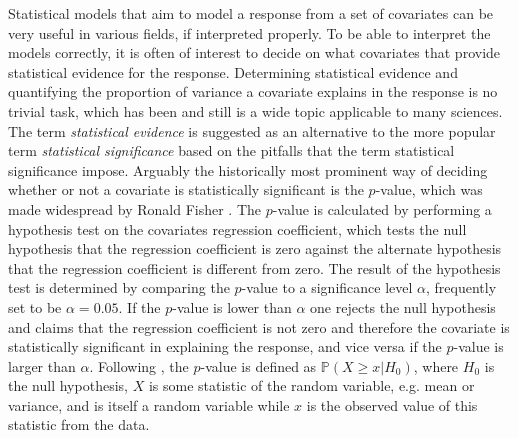 Statistical models that aim to model a response from a set of covariates can be very useful in various fields, if interpreted properly.
To be able to interpret the models correctly, it is often of interest to decide on what covariates that provide statistical evidence \citep{muff2022rewriting} for the response. 
Determining statistical evidence and quantifying the proportion of variance a covariate explains in the response is no trivial task, which has been and still is a wide topic applicable to many sciences.
The term \textit{statistical evidence} is suggested as an alternative to the more popular term \textit{statistical significance} based on the pitfalls that the term statistical significance impose.
\newline
\newline 
Arguably the historically most prominent way of deciding whether or not a covariate is statistically significant is the $p$-value, which was made widespread by Ronald Fisher \citep{Fisher1925}.
The $p$-value is calculated by performing a hypothesis test on the covariates regression coefficient, which tests the null hypothesis that the regression coefficient is zero against the alternate hypothesis that the regression coefficient is different from zero.
The result of the hypothesis test is determined by comparing the $p$-value to a significance level $\alpha$, frequently set to be $\alpha=0.05$.
If the $p$-value is lower than $\alpha$ one rejects the null hypothesis and claims that the regression coefficient is not zero and therefore the covariate is statistically significant in explaining the response, and vice versa if the $p$-value is larger than $\alpha$.
Following \citet{Goodman2008}, the $p$-value is defined as $\mathbb{P}(X \geq x \lvert H_0)$, where $H_0$ is the null hypothesis, $X$ is some statistic of the random variable, e.g. mean or variance, and is itself a random variable while $x$ is the observed value of this statistic from the data.

